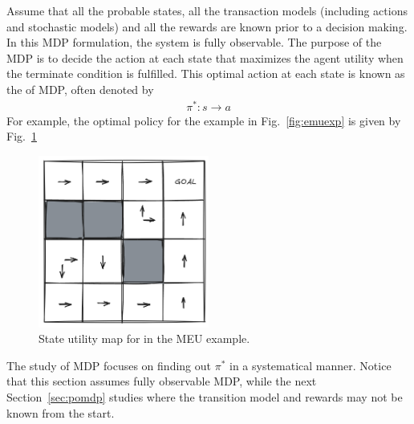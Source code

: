 Assume that all the probable states, all the transaction models (including actions and stochastic models) and all the rewards are known prior to a decision making. In this MDP formulation, the system is fully observable. The purpose of the MDP is to decide the action at each state that maximizes the agent utility when the terminate condition is fulfilled. This optimal action at each state is known as the  of MDP, often denoted by
\begin{eqnarray}
	\pi^*: s \rightarrow a \nonumber
\end{eqnarray}
For example, the optimal policy for the example in Fig.~\ref{fig:emuexp} is given by Fig.~\ref{fig:emuexppistar}
\begin{figure}[!htb]
	\centering
	\includegraphics[width=0.5\textwidth]{./chapters/part-1/figures/emuexppistar.png}
	\caption{State utility map for in the MEU example.}
	\label{fig:emuexppistar}
\end{figure}

The study of MDP focuses on finding out $\pi^*$ in a systematical manner. Notice that this section assumes fully observable MDP, while the next Section~\ref{sec:pomdp} studies  where the transition model and rewards may not be known from the start.

